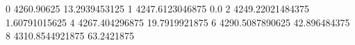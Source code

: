 0 4260.90625 13.2939453125
1 4247.6123046875 0.0
2 4249.22021484375 1.60791015625
4 4267.404296875 19.7919921875
6 4290.5087890625 42.896484375
8 4310.8544921875 63.2421875

